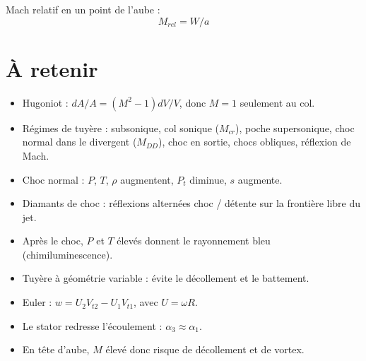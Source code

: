 \documentclass{article}
\begin{document}
Mach relatif en un point de l'aube :
\[ M_{rel} = W / a \]

\section{À retenir}
\begin{itemize}
\item Hugoniot : $dA/A = (M^2 - 1) dV/V$, donc $M = 1$ seulement au col.
\item Régimes de tuyère : subsonique, col sonique ($M_{cr}$), poche supersonique, choc normal dans le divergent ($M_{DD}$), choc en sortie, chocs obliques, réflexion de Mach.
\item Choc normal : $P$, $T$, $\rho$ augmentent, $P_t$ diminue, $s$ augmente.
\item Diamants de choc : réflexions alternées choc / détente sur la frontière libre du jet.
\item Après le choc, $P$ et $T$ élevés donnent le rayonnement bleu (chimiluminescence).
\item Tuyère à géométrie variable : évite le décollement et le battement.
\item Euler : $w = U_2 V_{t2} - U_1 V_{t1}$, avec $U = \omega R$.
\item Le stator redresse l'écoulement : $\alpha_3 \approx \alpha_1$.
\item En tête d'aube, $M$ élevé donc risque de décollement et de vortex.
\end{itemize}
\end{document}
